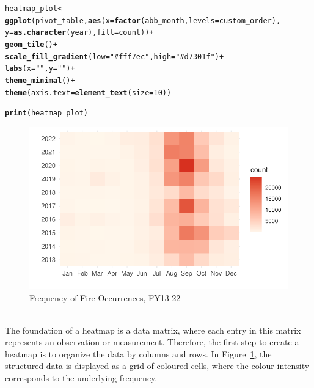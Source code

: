 \documentclass{article}\usepackage[]{graphicx}\usepackage[]{xcolor}
\makeatletter
\def\maxwidth{ %
  \ifdim\Gin@nat@width>\linewidth
    \linewidth
  \else
    \Gin@nat@width
  \fi
}
\newcommand{\hlnum}[1]{\textcolor[rgb]{0.686,0.059,0.569}{#1}}%
\newcommand{\hlstr}[1]{\textcolor[rgb]{0.192,0.494,0.8}{#1}}%
\newcommand{\hlopt}[1]{\textcolor[rgb]{0,0,0}{#1}}%
\newcommand{\hlstd}[1]{\textcolor[rgb]{0.345,0.345,0.345}{#1}}%
\newcommand{\hlkwb}[1]{\textcolor[rgb]{0.69,0.353,0.396}{#1}}%
\newcommand{\hlkwc}[1]{\textcolor[rgb]{0.333,0.667,0.333}{#1}}%
\newcommand{\hlkwd}[1]{\textcolor[rgb]{0.737,0.353,0.396}{\textbf{#1}}}%
\newenvironment{kframe}{%
 \def\at@end@of@kframe{}%
 \ifinner\ifhmode%
  \def\at@end@of@kframe{\end{minipage}}%
  \begin{minipage}{\columnwidth}%
 \fi\fi%
 \def\FrameCommand##1{\hskip\@totalleftmargin \hskip-\fboxsep
 \colorbox{shadecolor}{##1}\hskip-\fboxsep
     \hskip-\linewidth \hskip-\@totalleftmargin \hskip\columnwidth}%
 \MakeFramed {\advance\hsize-\width
   \@totalleftmargin\z@ \linewidth\hsize
   \@setminipage}}%
 {\par\unskip\endMakeFramed%
 \at@end@of@kframe}
\newenvironment{knitrout}{}{} %
\makeatother
\begin{document}
\begin{knitrout}
\color{fgcolor}\begin{kframe}
\begin{alltt}
\hlstd{heatmap_plot} \hlkwb{<-} \hlkwd{ggplot}\hlstd{(pivot_table,} \hlkwd{aes}\hlstd{(}\hlkwc{x} \hlstd{=} \hlkwd{factor}\hlstd{(abb_month,} \hlkwc{levels} \hlstd{= custom_order),}
                                        \hlkwc{y} \hlstd{=} \hlkwd{as.character}\hlstd{(year),} \hlkwc{fill} \hlstd{= count))} \hlopt{+}
  \hlkwd{geom_tile}\hlstd{()} \hlopt{+}
  \hlkwd{scale_fill_gradient}\hlstd{(}\hlkwc{low} \hlstd{=} \hlstr{"#fff7ec"}\hlstd{,} \hlkwc{high} \hlstd{=} \hlstr{"#d7301f"}\hlstd{)} \hlopt{+}
  \hlkwd{labs}\hlstd{(}\hlkwc{x} \hlstd{=} \hlstr{" "}\hlstd{,} \hlkwc{y} \hlstd{=} \hlstr{" "}\hlstd{)} \hlopt{+}
  \hlkwd{theme_minimal}\hlstd{()} \hlopt{+}
  \hlkwd{theme}\hlstd{(}\hlkwc{axis.text} \hlstd{=} \hlkwd{element_text}\hlstd{(}\hlkwc{size} \hlstd{=} \hlnum{10}\hlstd{))}

\hlkwd{print}\hlstd{(heatmap_plot)}
\end{alltt}
\end{kframe}\begin{figure}
\includegraphics[width=\maxwidth]{figure/fire-by-months-fy13-22-1} \caption[Frequency of Fire Occurrences, FY13-22]{Frequency of Fire Occurrences, FY13-22}\label{fig:fire-by-months-fy13-22}
\end{figure}

\end{knitrout}
\\The foundation of a heatmap is a data matrix, where each entry in this matrix represents an observation or measurement. Therefore, the first step to create a heatmap is to organize the data by columns and rows. In Figure~\ref{fig:fire-by-months-fy13-22}, the structured data is displayed as a grid of coloured cells, where the colour intensity corresponds to the underlying frequency.
\end{document}
